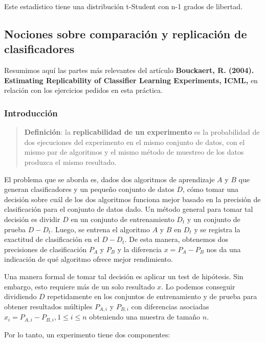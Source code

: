 \documentclass[11pt]{article}
\begin{document}
Este estadístico tiene una distribución t-Student con n-1 grados de
libertad.

    \subsection{Nociones sobre comparación y replicación de
clasificadores}\label{nociones-sobre-comparaciuxf3n-y-replicaciuxf3n-de-clasificadores}

Resumimos aquí las partes más relevantes del artículo \textbf{Bouckaert,
R. (2004). Estimating Replicability of Classifier Learning Experiments,
ICML,} en relación con los ejercicios pedidos en esta práctica.

\subsubsection{Introducción}\label{introducciuxf3n}

\begin{quote}
\textbf{Definición}: la \textbf{replicabilidad de un experimento} es la
probabilidad de dos ejecuciones del experimento en el mismo conjunto de
datos, con el mismo par de algoritmos y el mismo método de muestreo de
los datos produzca el mismo resultado.
\end{quote}

El problema que se aborda es, dados dos algoritmos de aprendizaje \(A\)
y \(B\) que generan clasificadores y un pequeño conjunto de datos \(D\),
cómo tomar una decisión sobre cuál de los dos algoritmos funciona mejor
basado en la precisión de clasificación para el conjunto de datos dado.
Un método general para tomar tal decisión es dividir \(D\) en un
conjunto de entrenamiento \(D_t\) y un conjunto de prueba \(D - D_t\).
Luego, se entrena el algoritmo \(A\) y \(B\) en \(D_t\) y se registra la
exactitud de clasificación en el \(D - D_t\). De esta manera, obtenemos
dos precisiones de clasificación \(P_A\) y \(P_B\) y la diferencia
\(x = P_A - P_B\) nos da una indicación de qué algoritmo ofrece mejor
rendimiento.

Una manera formal de tomar tal decisión es aplicar un test de hipótesis.
Sin embargo, esto requiere más de un solo resultado \(x\). Lo podemos
conseguir dividiendo \(D\) repetidamente en los conjuntos de
entrenamiento y de prueba para obtener resultados múltiples \(P_{A,i}\)
y \(P_{B,i}\) con diferencias asociadas
\(x_i = P_{A,i} - P_{B,i}, 1 \le i \le n\) obteniendo una muestra de
tamaño \(n\).

Por lo tanto, un experimento tiene dos componentes:
\end{document}
